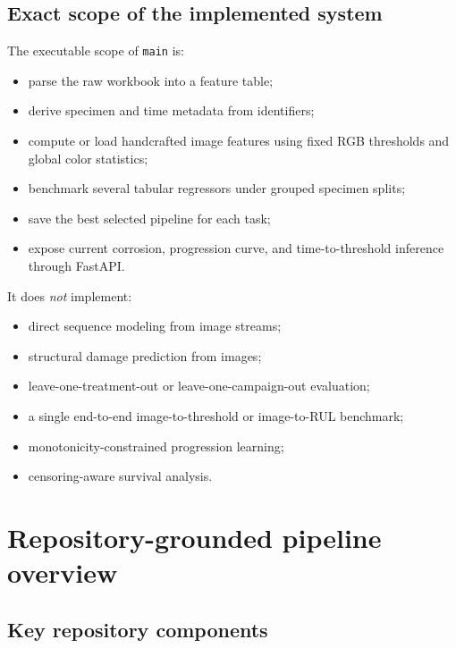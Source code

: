 \documentclass[11pt]{article}
\begin{document}
\subsection{Exact scope of the implemented system}
The executable scope of \texttt{main} is:
\begin{itemize}
  \item parse the raw workbook into a feature table;
  \item derive specimen and time metadata from identifiers;
  \item compute or load handcrafted image features using fixed RGB thresholds and global color statistics;
  \item benchmark several tabular regressors under grouped specimen splits;
  \item save the best selected pipeline for each task;
  \item expose current corrosion, progression curve, and time-to-threshold inference through FastAPI.
\end{itemize}

It does \emph{not} implement:
\begin{itemize}
  \item direct sequence modeling from image streams;
  \item structural damage prediction from images;
  \item leave-one-treatment-out or leave-one-campaign-out evaluation;
  \item a single end-to-end image-to-threshold or image-to-RUL benchmark;
  \item monotonicity-constrained progression learning;
  \item censoring-aware survival analysis.
\end{itemize}

\section{Repository-grounded pipeline overview}

\subsection{Key repository components}
\end{document}
